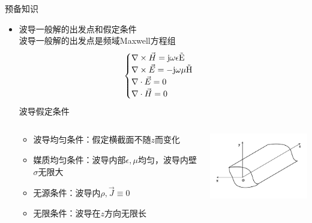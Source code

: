 \begin{frame}{预备知识}
    \begin{itemize}
        \item 波导一般解的出发点和假定条件\\
              波导一般解的出发点是频域Maxwell方程组
              \begin{align}
                  \begin{cases}
                      \nabla\times\vec{H}=\rm{j}\omega\epsilon\vec{E} \\
                      \nabla\times\vec{E}=-\rm{j}\omega\mu\vec{H}     \\
                      \nabla\cdot\vec{E}=0                            \\
                      \nabla\cdot\vec{H}=0
                  \end{cases}
                  \label{eqn6-1}
              \end{align}
              波导假定条件
              \begin{columns}
                  \begin{column}{0.5\linewidth}
                      \begin{itemize}
                          \item 波导均匀条件：假定横截面不随$z$而变化
                          \item 媒质均匀条件：波导内部$\epsilon,\mu$均匀，波导内壁$\sigma$无限大
                          \item 无源条件：波导内$\rho,\vec{J}\equiv 0$
                          \item 无限条件：波导在$z$方向无限长
                      \end{itemize}
                  \end{column}
                  \begin{column}{0.5\linewidth}
                      \includegraphics[width=5cm]{Cha6//fig6-1.pdf}
                  \end{column}
              \end{columns}
    \end{itemize}
\end{frame}

